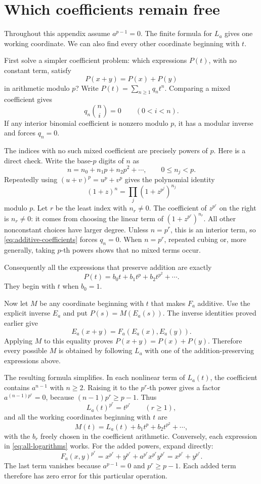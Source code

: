 \section{Which coefficients remain free}\label{app:freedom}

Throughout this appendix assume \(a^{p-1}=0\). The finite formula for \(L_a\) gives one working coordinate. We can also find every other coordinate beginning with \(t\).

First solve a simpler coefficient problem: which expressions \(P(t)\), with no constant term, satisfy
\[
 P(x+y)=P(x)+P(y)
\]
in arithmetic modulo \(p\)? Write \(P(t)=\sum_{n\ge1}q_nt^n\). Comparing a mixed coefficient gives
\begin{equation}\label{eq:additive-coefficients}
 q_n\binom ni=0\qquad(0<i<n).
\end{equation}
If any interior binomial coefficient is nonzero modulo \(p\), it has a modular inverse and forces \(q_n=0\).

The indices with no such mixed coefficient are precisely powers of \(p\). Here is a direct check. Write the base-\(p\) digits of \(n\) as
\[
 n=n_0+n_1p+n_2p^2+\cdots,\qquad0\le n_j<p.
\]
Repeatedly using \((u+v)^p=u^p+v^p\) gives the polynomial identity
\[
 (1+z)^n=\prod_j(1+z^{p^j})^{n_j}
\]
modulo \(p\). Let \(r\) be the least index with \(n_r\ne0\). The coefficient of \(z^{p^r}\) on the right is \(n_r\ne0\): it comes from choosing the linear term of \((1+z^{p^r})^{n_r}\). All other nonconstant choices have larger degree. Unless \(n=p^r\), this is an interior term, so \eqref{eq:additive-coefficients} forces \(q_n=0\). When \(n=p^r\), repeated cubing or, more generally, taking \(p\)-th powers shows that no mixed terms occur.

Consequently all the expressions that preserve addition are exactly
\[
 P(t)=b_0t+b_1t^p+b_2t^{p^2}+\cdots.
\]
They begin with \(t\) when \(b_0=1\).

Now let \(M\) be any coordinate beginning with \(t\) that makes \(F_a\) additive. Use the explicit inverse \(E_a\) and put \(P(s)=M(E_a(s))\). The inverse identities proved earlier give
\[
 E_a(x+y)=F_a(E_a(x),E_a(y)).
\]
Applying \(M\) to this equality proves \(P(x+y)=P(x)+P(y)\). Therefore every possible \(M\) is obtained by following \(L_a\) with one of the addition-preserving expressions above.

The resulting formula simplifies. In each nonlinear term of \(L_a(t)\), the coefficient contains \(a^{n-1}\) with \(n\ge2\). Raising it to the \(p^r\)-th power gives a factor \(a^{(n-1)p^r}=0\), because \((n-1)p^r\ge p-1\). Thus
\[
 L_a(t)^{p^r}=t^{p^r}\qquad(r\ge1),
\]
and all the working coordinates beginning with \(t\) are
\begin{equation}\label{eq:all-logarithms}
 \boxed{\;M(t)=L_a(t)+b_1t^p+b_2t^{p^2}+\cdots,\;}
\end{equation}
with the \(b_r\) freely chosen in the coefficient arithmetic. Conversely, each expression in \eqref{eq:all-logarithms} works. For the added powers, expand directly:
\[
 F_a(x,y)^{p^r}
 =x^{p^r}+y^{p^r}+a^{p^r}x^{p^r}y^{p^r}
 =x^{p^r}+y^{p^r}.
\]
The last term vanishes because \(a^{p-1}=0\) and \(p^r\ge p-1\). Each added term therefore has zero error for this particular operation.

